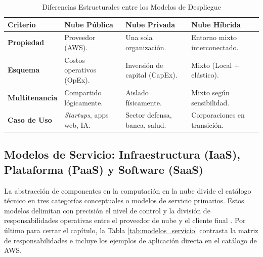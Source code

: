 \documentclass[12pt,a4paper]{article}
\begin{document}
\vspace{0.3cm}
\begin{table}[H]
\centering
\caption{Diferencias Estructurales entre los Modelos de Despliegue}
\label{tab:modelos_despliegue}
\begin{tabular}{ p{2.8cm} p{3.4cm} p{3.4cm} p{3.4cm} }
\toprule
\textbf{Criterio} & \textbf{Nube Pública} & \textbf{Nube Privada} & \textbf{Nube Híbrida} \\
\midrule
\textbf{Propiedad} & Proveedor (AWS). & Una sola organización. & Entorno mixto interconectado. \\
\textbf{Esquema} & Costos operativos (OpEx). & Inversión de capital (CapEx). & Mixto (Local + elástico). \\
\textbf{Multitenancia} & Compartido lógicamente. & Aislado físicamente. & Mixto según sensibilidad. \\
\textbf{Caso de Uso} & \textit{Startups}, apps web, IA. & Sector defensa, banca, salud. & Corporaciones en transición. \\
\bottomrule
\end{tabular}
\end{table}
\vspace{0.3cm}

\subsection{Modelos de Servicio: Infraestructura (IaaS), Plataforma (PaaS) y Software (SaaS)}

La abstracción de componentes en la computación en la nube divide el catálogo técnico en tres categorías conceptuales o modelos de servicio primarios. Estos modelos delimitan con precisión el nivel de control y la división de responsabilidades operativas entre el proveedor de nube y el cliente final \parencite{subashini2011}. Por último para cerrar el capítulo, la Tabla \ref{tab:modelos_servicio} contrasta la matriz de responsabilidades e incluye los ejemplos de aplicación directa en el catálogo de AWS.
\end{document}
